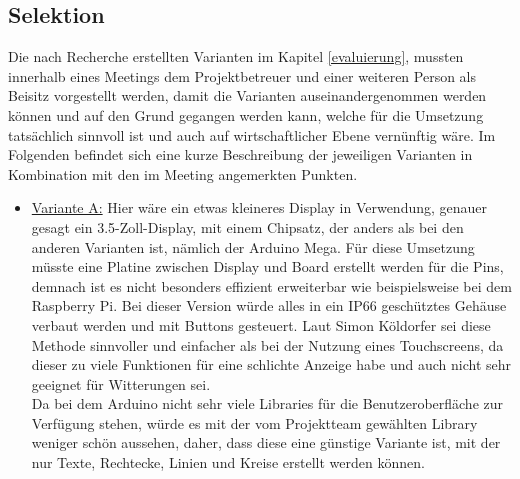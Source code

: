 \newpage
\subsection{Selektion} \label{selektion}
Die nach Recherche erstellten Varianten im Kapitel \ref{evaluierung}, mussten innerhalb eines Meetings dem Projektbetreuer und einer weiteren Person als Beisitz vorgestellt werden, damit die Varianten auseinandergenommen werden können und auf den Grund gegangen werden kann, welche für die Umsetzung tatsächlich sinnvoll ist und auch auf wirtschaftlicher Ebene vernünftig wäre. Im Folgenden befindet sich eine kurze Beschreibung der jeweiligen Varianten in Kombination mit den im Meeting angemerkten Punkten.

\begin{itemize}
	\item \underline{Variante A:} Hier wäre ein etwas kleineres Display in Verwendung, genauer gesagt ein 3.5-Zoll-Display, mit einem Chipsatz, der anders als bei den anderen Varianten ist, nämlich der Arduino Mega. Für diese Umsetzung müsste eine Platine zwischen Display und Board erstellt werden für die Pins, demnach ist es nicht besonders effizient erweiterbar wie beispielsweise bei dem Raspberry Pi. Bei dieser Version würde alles in ein IP66 geschütztes Gehäuse verbaut werden und mit Buttons gesteuert. Laut Simon Köldorfer sei diese Methode sinnvoller und einfacher als bei der Nutzung eines Touchscreens, da dieser zu viele Funktionen für eine schlichte Anzeige habe und auch nicht sehr geeignet für Witterungen sei. \\
	Da bei dem Arduino nicht sehr viele Libraries für die Benutzeroberfläche zur Verfügung stehen, würde es mit der vom Projektteam gewählten Library weniger schön aussehen, daher, dass diese eine günstige Variante ist, mit der nur Texte, Rechtecke, Linien und Kreise erstellt werden können.
	

\end{itemize}
